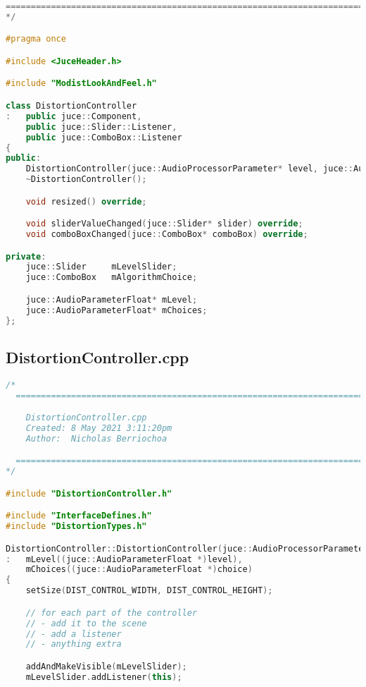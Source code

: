 \documentclass{article}
\begin{document}
\begin{appendix}
\begin{lstlisting}[language=C++]
  ==============================================================================
*/

#pragma once

#include <JuceHeader.h>

#include "ModistLookAndFeel.h"

class DistortionController
:   public juce::Component,
    public juce::Slider::Listener,
    public juce::ComboBox::Listener
{
public:
    DistortionController(juce::AudioProcessorParameter* level, juce::AudioProcessorParameter* choice, juce::Colour colour);
    ~DistortionController();

    void resized() override;

    void sliderValueChanged(juce::Slider* slider) override;
    void comboBoxChanged(juce::ComboBox* comboBox) override;

private:
    juce::Slider     mLevelSlider;
    juce::ComboBox   mAlgorithmChoice;

    juce::AudioParameterFloat* mLevel;
    juce::AudioParameterFloat* mChoices;
};

\end{lstlisting}


\pagebreak
\subsection{DistortionController.cpp}
\begin{lstlisting}[language=C++]
/*
  ==============================================================================

    DistortionController.cpp
    Created: 8 May 2021 3:11:20pm
    Author:  Nicholas Berriochoa

  ==============================================================================
*/

#include "DistortionController.h"

#include "InterfaceDefines.h"
#include "DistortionTypes.h"

DistortionController::DistortionController(juce::AudioProcessorParameter* level, juce::AudioProcessorParameter* choice, juce::Colour colour)
:   mLevel((juce::AudioParameterFloat *)level),
    mChoices((juce::AudioParameterFloat *)choice)
{
    setSize(DIST_CONTROL_WIDTH, DIST_CONTROL_HEIGHT);

    // for each part of the controller
    // - add it to the scene
    // - add a listener
    // - anything extra

    addAndMakeVisible(mLevelSlider);
    mLevelSlider.addListener(this);


\end{lstlisting}
\end{appendix}
\end{document}
